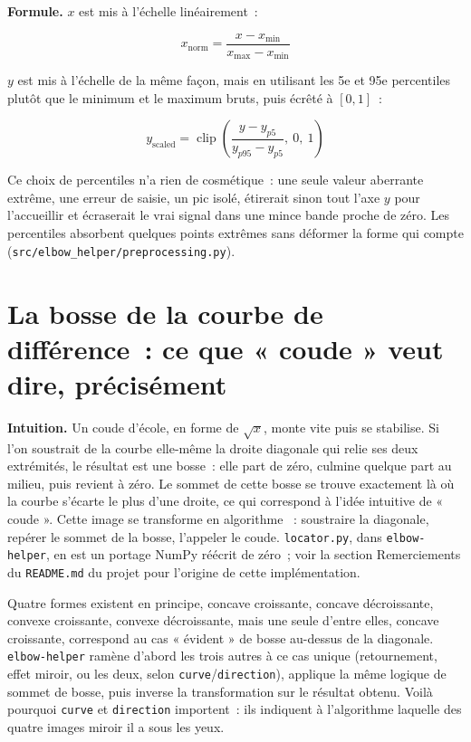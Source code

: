\documentclass[11pt]{article}
\newcommand{\code}[1]{\texttt{#1}}
\begin{document}
\textbf{Formule.} $x$ est mis à l'échelle linéairement~:

\begin{equation}
x_{\text{norm}} = \frac{x - x_{\min}}{x_{\max} - x_{\min}}
\end{equation}

$y$ est mis à l'échelle de la même façon, mais en utilisant les 5e et 95e
percentiles plutôt que le minimum et le maximum bruts, puis écrêté à
$[0,1]$~:

\begin{equation}
y_{\text{scaled}} = \operatorname{clip}\!\left(\frac{y - y_{p5}}{y_{p95} - y_{p5}},\ 0,\ 1\right)
\end{equation}

Ce choix de percentiles n'a rien de cosmétique~: une seule valeur aberrante
extrême, une erreur de saisie, un pic isolé, étirerait sinon tout l'axe $y$
pour l'accueillir et écraserait le vrai signal dans une mince bande proche
de zéro. Les percentiles absorbent quelques points extrêmes sans déformer
la forme qui compte (\code{src/elbow\_helper/preprocessing.py}).

\section{La bosse de la courbe de différence~: ce que « coude » veut dire, précisément}

\textbf{Intuition.} Un coude d'école, en forme de $\sqrt{x}$, monte vite
puis se stabilise. Si l'on soustrait de la courbe elle-même la droite
diagonale qui relie ses deux extrémités, le résultat est une bosse~: elle
part de zéro, culmine quelque part au milieu, puis revient à zéro. Le
sommet de cette bosse se trouve exactement là où la courbe s'écarte le plus
d'une droite, ce qui correspond à l'idée intuitive de « coude ». Cette image
se transforme en algorithme \citep{satopaa2011}~: soustraire la diagonale,
repérer le sommet de la bosse, l'appeler le coude. \code{locator.py}, dans
\code{elbow-helper}, en est un portage NumPy réécrit de zéro~; voir la
section Remerciements du \code{README.md} du projet pour l'origine de cette
implémentation.

Quatre formes existent en principe, concave croissante, concave
décroissante, convexe croissante, convexe décroissante, mais une seule
d'entre elles, concave croissante, correspond au cas « évident » de bosse
au-dessus de la diagonale. \code{elbow-helper} ramène d'abord les trois
autres à ce cas unique (retournement, effet miroir, ou les deux, selon
\code{curve}/\code{direction}), applique la même logique de sommet de
bosse, puis inverse la transformation sur le résultat obtenu. Voilà
pourquoi \code{curve} et \code{direction} importent~: ils indiquent à
l'algorithme laquelle des quatre images miroir il a sous les yeux.
\end{document}
